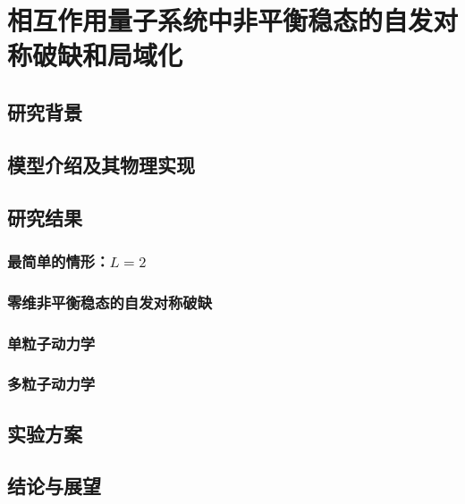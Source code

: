 
\chapter{相互作用量子系统中非平衡稳态的自发对称破缺和局域化}

	\section{研究背景}

	\section{模型介绍及其物理实现}

	\section{研究结果}

		\subsection{最简单的情形：$L=2$}

		\subsection{零维非平衡稳态的自发对称破缺}

		\subsection{单粒子动力学}

		\subsection{多粒子动力学}
		
	\section{实验方案}

	\section{结论与展望}